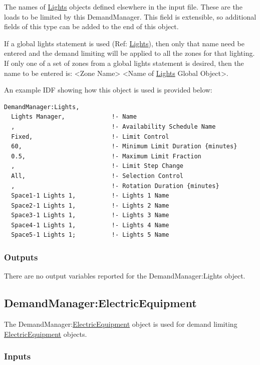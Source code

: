 The names of \hyperref[lights-000]{Lights} objects defined elsewhere in the input file. These are the loads to be limited by this DemandManager.  This field is extensible, so additional fields of this type can be added to the end of this object.

If a global lights statement is used (Ref: \hyperref[lights-000]{Lights}), then only that name need be entered and the demand limiting will be applied to all the zones for that lighting. If only one of a set of zones from a global lights statement is desired, then the name to be entered is: \textless{}Zone Name\textgreater{} \textless{}Name of \hyperref[lights-000]{Lights} Global Object\textgreater{}.

An example IDF showing how this object is used is provided below:

\begin{lstlisting}
DemandManager:Lights,
  Lights Manager,             !- Name
  ,                           !- Availability Schedule Name
  Fixed,                      !- Limit Control
  60,                         !- Minimum Limit Duration {minutes}
  0.5,                        !- Maximum Limit Fraction
  ,                           !- Limit Step Change
  All,                        !- Selection Control
  ,                           !- Rotation Duration {minutes}
  Space1-1 Lights 1,          !- Lights 1 Name
  Space2-1 Lights 1,          !- Lights 2 Name
  Space3-1 Lights 1,          !- Lights 3 Name
  Space4-1 Lights 1,          !- Lights 4 Name
  Space5-1 Lights 1;          !- Lights 5 Name
\end{lstlisting}

\subsubsection{Outputs}\label{outputs-2-005}

There are no output variables reported for the DemandManager:Lights object.

\subsection{DemandManager:ElectricEquipment}\label{demandmanagerelectricequipment}

The DemandManager:\hyperref[electricequipment]{ElectricEquipment} object is used for demand limiting \hyperref[electricequipment]{ElectricEquipment} objects.

\subsubsection{Inputs}\label{inputs-3-008}

